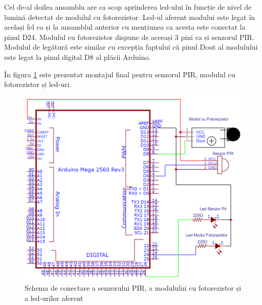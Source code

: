Cel de-al doilea ansamblu are ca scop aprinderea led-ului în funcție de nivel de lumină detectat de modulul cu fotorezistor. Led-ul aferent modului este legat în același fel ca și la ansamblul anterior cu mențiunea ca acesta este conectat la pinul D24. Modulul cu fotorezistor dispune de aceeași 3 pini ca și senzorul PIR. Modulul de legătură este similar cu excepția faptului că pinul Dout al modulului este legat la pinul digital D8 al plăcii Arduino.

În figura \ref{fig:conexiune_pir_lum_led} este prezentat montajul final pentru senzorul PIR, modulul cu fotorezistor și led-uri.

\begin{figure}[H]
\includegraphics[width=0.8\linewidth]{bachelors_ro/images/conexiune_pir_lum_led.png}
\caption{Schema de conectare a senzorului PIR, a modulului cu fotorezistor și a led-urilor aferent}
\label{fig:conexiune_pir_lum_led}
\end{figure}